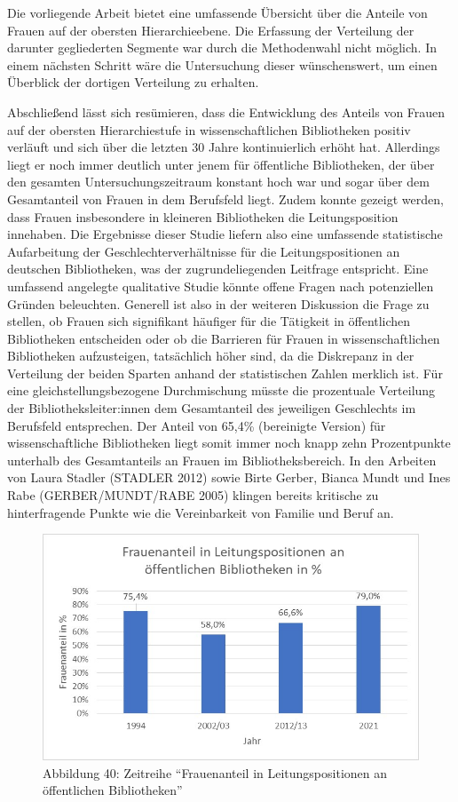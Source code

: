 \documentclass[a4paper,
fontsize=11pt,
oneside,
numbers=noperiodatend,
parskip=half-,
bibliography=totoc,
final
]{scrartcl}
\begin{document}
Die vorliegende Arbeit bietet eine umfassende Übersicht über die Anteile
von Frauen auf der obersten Hierarchieebene. Die Erfassung der
Verteilung der darunter gegliederten Segmente war durch die Methodenwahl
nicht möglich. In einem nächsten Schritt wäre die Untersuchung dieser
wünschenswert, um einen Überblick der dortigen Verteilung zu erhalten.

Abschließend lässt sich resümieren, dass die Entwicklung des Anteils von
Frauen auf der obersten Hierarchiestufe in wissenschaftlichen
Bibliotheken positiv verläuft und sich über die letzten 30 Jahre
kontinuierlich erhöht hat. Allerdings liegt er noch immer deutlich unter
jenem für öffentliche Bibliotheken, der über den gesamten
Untersuchungszeitraum konstant hoch war und sogar über dem Gesamtanteil
von Frauen in dem Berufsfeld liegt. Zudem konnte gezeigt werden, dass
Frauen insbesondere in kleineren Bibliotheken die Leitungsposition
innehaben. Die Ergebnisse dieser Studie liefern also eine umfassende
statistische Aufarbeitung der Geschlechterverhältnisse für die
Leitungspositionen an deutschen Bibliotheken, was der zugrundeliegenden
Leitfrage entspricht. Eine umfassend angelegte qualitative Studie könnte
offene Fragen nach potenziellen Gründen beleuchten. Generell ist also in
der weiteren Diskussion die Frage zu stellen, ob Frauen sich signifikant
häufiger für die Tätigkeit in öffentlichen Bibliotheken entscheiden oder
ob die Barrieren für Frauen in wissenschaftlichen Bibliotheken
aufzusteigen, tatsächlich höher sind, da die Diskrepanz in der
Verteilung der beiden Sparten anhand der statistischen Zahlen merklich
ist. Für eine gleichstellungsbezogene Durchmischung müsste die
prozentuale Verteilung der Bibliotheksleiter:innen dem Gesamtanteil des
jeweiligen Geschlechts im Berufsfeld entsprechen. Der Anteil von 65,4\%
(bereinigte Version) für wissenschaftliche Bibliotheken liegt somit
immer noch knapp zehn Prozentpunkte unterhalb des Gesamtanteils an
Frauen im Bibliotheksbereich. In den Arbeiten von Laura Stadler (STADLER
2012) sowie Birte Gerber, Bianca Mundt und Ines Rabe (GERBER/MUNDT/RABE
2005) klingen bereits kritische zu hinterfragende Punkte wie die
Vereinbarkeit von Familie und Beruf an.

\begin{figure}
\centering
\includegraphics{img/Abb_40_Zeitreihe-OB.jpg}
\caption{Abbildung 40: Zeitreihe \enquote{Frauenanteil in
Leitungspositionen an öffentlichen Bibliotheken}}
\end{figure}
\end{document}

